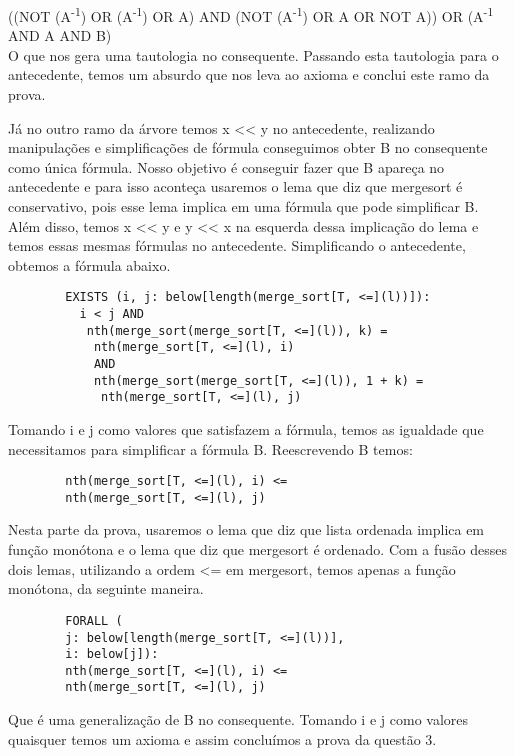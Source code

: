 \documentclass[12pt]{article}
\begin{document}
        ((NOT (A\textsuperscript{-1}) OR (A\textsuperscript{-1}) OR A) AND (NOT (A\textsuperscript{-1}) OR A OR NOT A)) OR (A\textsuperscript{-1} AND A AND B) \\
        
        O que nos gera uma tautologia no consequente. Passando esta tautologia para o antecedente, temos um absurdo que nos leva ao axioma e conclui este ramo da prova.
        
        Já no outro ramo da árvore temos x << y no antecedente, realizando manipulações e simplificações de fórmula conseguimos obter B no consequente como única fórmula. Nosso objetivo é conseguir fazer que B apareça no antecedente e para isso aconteça usaremos o lema que diz que mergesort é conservativo, pois esse lema implica em uma fórmula que pode simplificar B. Além disso, temos x << y e y << x na esquerda dessa implicação do lema e temos essas mesmas fórmulas no antecedente. Simplificando o antecedente, obtemos a fórmula abaixo.
        
        \begin{verbatim}
        EXISTS (i, j: below[length(merge_sort[T, <=](l))]):
          i < j AND
           nth(merge_sort(merge_sort[T, <=](l)), k) =
            nth(merge_sort[T, <=](l), i)
            AND
            nth(merge_sort(merge_sort[T, <=](l)), 1 + k) =
             nth(merge_sort[T, <=](l), j)
        \end{verbatim}


        Tomando i e j como valores que satisfazem a fórmula, temos as igualdade que necessitamos para simplificar a fórmula B. Reescrevendo B temos:
        
        \begin{verbatim}
        nth(merge_sort[T, <=](l), i) <= 
        nth(merge_sort[T, <=](l), j)
        \end{verbatim}
        
        Nesta parte da prova, usaremos o lema que diz que lista ordenada implica em função monótona e o lema que diz que mergesort é ordenado. Com a fusão desses dois lemas, utilizando a ordem <= em mergesort, temos apenas a função monótona, da seguinte maneira.
        
        \begin{verbatim}
        FORALL (
        j: below[length(merge_sort[T, <=](l))], 
        i: below[j]):
        nth(merge_sort[T, <=](l), i) <= 
        nth(merge_sort[T, <=](l), j)
        \end{verbatim}
        
        Que é uma generalização de B no consequente. Tomando i e j como valores quaisquer temos um axioma e assim concluímos a prova da questão 3.
        
        
 
\end{document}
